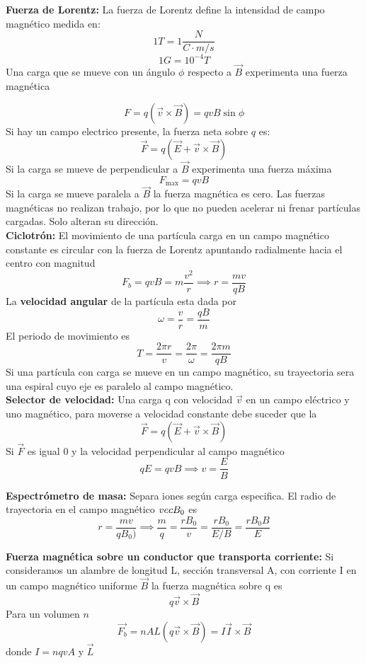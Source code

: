 \documentclass[a4paper, 10pt]{article}
\begin{document}
\begin{multicols*}{2}
	\textbf{Fuerza de Lorentz:} La fuerza de Lorentz define la intensidad de campo magnético medida en:
	$$1 T = 1 \frac{N}{C \cdot m/s}$$
	$$1 G = 10^{-4} T$$
	Una carga que se mueve con un ángulo $\phi$ respecto a $\vec{B}$ experimenta una fuerza magnética
	     
	$$F =q(\vec{v}\times\vec{B}) =qvB\sin{\phi} $$
	Si hay un campo electrico presente, la fuerza neta sobre $q$ es:
	$$\vec{F}=q(\vec{E}+\vec{v}\times \vec{B})$$
	Si la carga se mueve de perpendicular a $\vec{B}$ experimenta una fuerza máxima 
	$$F_{\text{max}}=qvB$$
	Si la carga se mueve paralela a $\vec{B}$ la fuerza magnética es cero.
	Las fuerzas magnéticas no realizan trabajo, por lo que no pueden acelerar ni frenar partículas cargadas. Solo alteran su dirección.\\
	     
	\textbf{Ciclotrón:} El movimiento de una partícula carga en un campo magnético constante es circular con la fuerza de Lorentz apuntando radialmente hacia el centro con magnitud
	$$F_b = qvB = m \frac{v^2}{r} \implies r = \frac{mv}{qB}$$
	La  \textbf{velocidad angular} de la partícula esta dada por 
	$$\omega=\frac{v}{r}=\frac{qB}{m}$$
	El periodo de movimiento es 
	$$T=\frac{2\pi r}{v}=\frac{2\pi}{\omega}=\frac{2\pi m}{qB}$$
	Si una partícula con carga se mueve en un campo magnético, su trayectoria sera una espiral cuyo eje es paralelo al campo magnético.\\
	     
	\textbf{Selector de velocidad:} Una carga q con velocidad $\vec{v}$ en un campo eléctrico y uno magnético, para moverse a velocidad constante debe suceder que la 
	$$\vec{F} = q(\vec{E}+\vec{v}\times\vec{B})$$
	Si $\vec{F}$ es igual 0 y la velocidad perpendicular al campo magnético
	$$qE = qvB \implies v = \frac{E}{B}$$
	     
	\textbf{Espectrómetro de masa:} Separa iones según carga especifica. 
	El radio de trayectoria en el campo magnético $\\vec{B}_0$ es
	$$r = \frac{mv}{qB_0)}\implies \frac{m}{q}=\frac{rB_0}{v}=\frac{rB_0}{E/B}=\frac{rB_0B}{E}$$
	      
	\textbf{Fuerza magnética sobre un conductor que transporta corriente:}
	Si consideramos un alambre de longitud L, sección transversal A, con corriente I en un campo magnético uniforme $\vec{B}$
	la fuerza magnética sobre q es
	$$q\vec{v}\times\vec{B}$$
	Para un volumen $n$
	$$\vec{F_b} = nAL(q\vec{v}\times\vec{B}) = I\vec{I} \times \vec{B}$$
	donde $I = nqvA$ y $\vec{L}$
	    

\end{multicols*}
\end{document}
